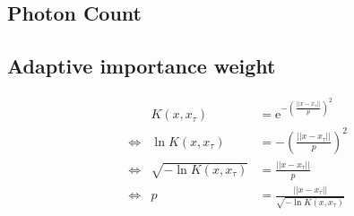 \subsection{Photon Count}

\subsection{Adaptive importance weight}



\begin{align}
&&K(x, x_\tau)&=\mathrm{e}^{-\left(\frac{||x-x_\tau||}{p}\right)^2} \\
&\Leftrightarrow&\ln{K(x, x_\tau)} &= -\left(\frac{||x-x_\tau||}{p}\right)^2 \\
&\Leftrightarrow& \sqrt{-\ln{K(x, x_\tau)}} &= \frac{||x-x_\tau||}{p} \\
&\Leftrightarrow& p &= \frac{||x-x_\tau||}{\sqrt{-\ln{K(x, x_\tau)}}}
\end{align}